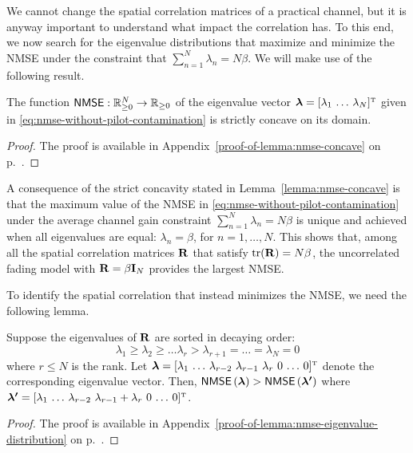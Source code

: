 We cannot change the spatial correlation matrices of a practical channel, but it is anyway important to understand what impact the correlation has. To this end, we now search for the eigenvalue distributions that maximize and minimize the NMSE under the constraint that $\sum_{n=1}^N\lambda_n=N\beta$. We will make use of the following result.

\begin{lemma}\label{lemma:nmse-concave} The function $\mathsf{NMSE} : \mathbb{R}_{\geq 0}^{N} \to \mathbb{R}_{\geq 0}$ of the eigenvalue vector $\boldsymbol{\lambda}=[ \lambda_1 \, \ldots \, \lambda_N ]^{\Ttran}$ given in \eqref{eq:nmse-without-pilot-contamination} is strictly concave on its domain.
\end{lemma}
\begin{proof}
The proof is available in Appendix~\ref{proof-of-lemma:nmse-concave} on p.~\pageref{proof-of-lemma:nmse-concave}.
\end{proof}

A consequence of the strict concavity stated in Lemma~\ref{lemma:nmse-concave} is that the maximum value of the NMSE in \eqref{eq:nmse-without-pilot-contamination} under the average channel gain constraint $\sum_{n=1}^N\lambda_n=N\beta$ is unique and achieved when all eigenvalues are equal: $\lambda_n=\beta$, for $n=1,\ldots,N$. This shows that, among all the spatial correlation matrices $\mathbf{R}$ that satisfy $\mathrm{tr}( \mathbf{R} )=N\beta$, the uncorrelated fading model with $\mathbf{R}=\beta\mathbf{I}_N$ provides the largest NMSE.

To identify the spatial correlation that instead minimizes the NMSE, we need the following lemma.

\begin{lemma}\label{lemma:nmse-eigenvalue-distribution} Suppose the eigenvalues of $\mathbf{R}$ are sorted in decaying order:
\begin{equation}
\lambda_1\geq\lambda_2\geq\ldots\lambda_r>\lambda_{r+1}=\ldots=\lambda_N=0
\end{equation}
where $r\leq N$ is the rank. Let $\boldsymbol{\lambda}=[\lambda_1 \, \ldots \, \lambda_{r-2} \ \lambda_{r-1} \ \lambda_{r} \ 0  \, \ldots \, 0]^{\Ttran}$ denote the corresponding eigenvalue vector. Then, $\mathsf{NMSE}\left(\boldsymbol{\lambda}\right)>\mathsf{NMSE}\left(\boldsymbol{{\lambda}^\prime}\right)$ where $\boldsymbol{{\lambda}^\prime}=[\lambda_1 \, \ldots \, \lambda_{r-2} \ \lambda_{r-1}+\lambda_{r} \ 0 \, \ldots \, 0 ]^{\Ttran}$.
\end{lemma}
\begin{proof}
The proof is available in Appendix~\ref{proof-of-lemma:nmse-eigenvalue-distribution} on p.~\pageref{proof-of-lemma:nmse-eigenvalue-distribution}.
\end{proof}

